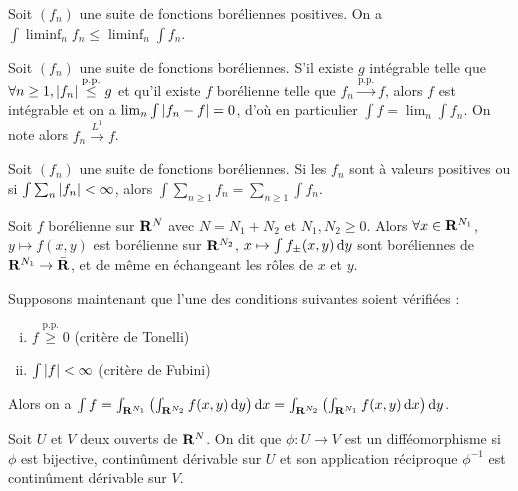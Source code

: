 \begin{lem}
	Soit $(f_n)$ une suite de fonctions boréliennes positives.
	On a $\int \liminf_n f_n \leq \liminf_n \int f_n$.
\end{lem}

\begin{thm}
	Soit $(f_n)$ une suite de fonctions boréliennes.
	S'il existe $g$ intégrable telle que $\forall n \geq 1, \left\lvert f_n\right\rvert \overset{\text{p.p.}}{\leq} g$ et qu'il existe $f$ borélienne telle que $f_n \overset{\text{p.p.}}{\to} f$, alors $f$ est intégrable et on a $\lim_n \int \left\lvert f_n - f\right\rvert = 0$, d'où en particulier $\int f = \lim_n \int f_n$.
	On note alors $f_n \overset{L^1}{\to} f$.
\end{thm}

\begin{thm}
	Soit $(f_n)$ une suite de fonctions boréliennes.
	Si les $f_n$ sont à valeurs positives ou si $\int \sum_n \left\lvert f_n\right\rvert < \infty$, alors $\int \sum_{n \geq 1} f_n = \sum_{n \geq 1} \int f_n$.
\end{thm}

\begin{thm}
	Soit $f$ borélienne sur $\mathbf{R}^N$ avec $N = N_1 + N_2$ et $N_1, N_2 \geq 0$.
	Alors $\forall x \in \mathbf{R}^{N_1}$, $y \mapsto f(x,y)$ est borélienne sur $\mathbf{R}^{N_2}$, $x \mapsto \int f_\pm (x,y) \mathop{}\mathopen{}\mathrm{d} y$ sont boréliennes de $\mathbf{R}^{N_1} \to \bar{\mathbf{R}}$, et de même en échangeant les rôles de $x$ et $y$.

	Supposons maintenant que l'une des conditions suivantes soient vérifiées :
	\begin{enumerate}[(i)]
		\item $f \overset{\text{p.p.}}{\geq} 0$ (critère de Tonelli)
		\item $\int \left\lvert f\right\rvert < \infty$ (critère de Fubini)
	\end{enumerate}
	Alors on a $\int f = \int_{\mathbf{R}^{N_1}} \left( \int_{\mathbf{R}^{N_2}} f(x,y) \mathop{}\mathopen{}\mathrm{d} y \right) \mathop{}\mathopen{}\mathrm{d} x = \int_{\mathbf{R}^{N_2}} \left( \int_{\mathbf{R}^{N_1}} f(x,y) \mathop{}\mathopen{}\mathrm{d} x \right) \mathop{}\mathopen{}\mathrm{d} y$.
\end{thm}

\begin{defn}
	Soit $U$ et $V$ deux ouverts de $\mathbf{R}^N$.
	On dit que $\phi \colon U \to V$ est un difféomorphisme si $\phi$ est bijective, continûment dérivable sur $U$ et son application réciproque $\phi^{-1}$ est continûment dérivable sur $V$.
\end{defn}

